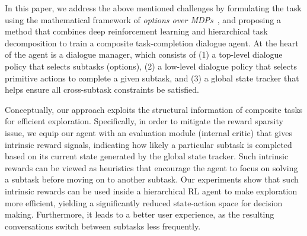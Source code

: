 \documentclass[11pt,letterpaper]{article}
\begin{document}

In this paper, we address the above mentioned challenges by formulating the task using the mathematical framework of \emph{options over MDPs}~\cite{DBLP:journals/ai/SuttonPS99}, and proposing a method that combines deep reinforcement learning and hierarchical task decomposition to train a composite task-completion dialogue agent. At the heart of the agent is a dialogue manager, which consists of (1) a top-level dialogue policy that selects subtasks (options), (2) a low-level dialogue policy that selects primitive actions to complete a given subtask, and (3) a global state tracker that helps ensure all cross-subtask constraints be satisfied.

Conceptually, our approach exploits the structural information of composite tasks for efficient exploration. Specifically, in order to mitigate the reward sparsity issue, we equip our agent with an evaluation module (internal critic) that gives intrinsic reward signals, indicating how likely a particular subtask is completed based on its current state generated by the global state tracker. Such intrinsic rewards can be viewed as heuristics that encourage the agent to focus on solving a subtask 
before moving on to another subtask. %
Our experiments show that such intrinsic rewards can be used inside a hierarchical RL agent to make exploration more efficient, yielding a significantly reduced state-action space for decision making. Furthermore, it leads to a better user experience, as the resulting conversations switch between subtasks less frequently.
\end{document}
